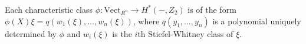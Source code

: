 Each characteristic class $\phi: \text{Vect}_{R^n} \rightarrow H^*(-, Z_2)$ is of the form $\phi(X)\xi = q(w_1(\xi), \ldots, w_n(\xi))$, where $q(y_1, \ldots, y_n)$ is a polynomial uniquely determined by $\phi$ and $w_i(\xi)$ is the $i$th Stiefel-Whitney class of $\xi$.
